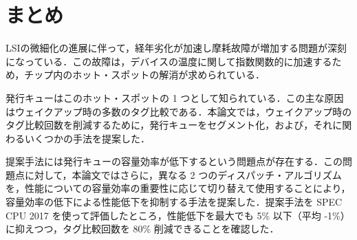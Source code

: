
\chapter{まとめ}
\label{sec:summary}
LSIの微細化の進展に伴って，経年劣化が加速し摩耗故障が増加する問題が深刻になっている．この故障は，デバイスの温度に関して指数関数的に加速するため，チップ内のホット・スポットの解消が求められている．

発行キューはこのホット・スポットの 1 つとして知られている．この主な原因はウェイクアップ時の多数のタグ比較である．本論文では，ウェイクアップ時のタグ比較回数を削減するために，発行キューをセグメント化，および，それに関わるいくつかの手法を提案した．

提案手法には発行キューの容量効率が低下するという問題点が存在する．この問題点に対して，本論文ではさらに，異なる 2 つのディスパッチ・アルゴリズムを，性能についての容量効率の重要性に応じて切り替えて使用することにより，容量効率の低下による性能低下を抑制する手法を提案した．提案手法を SPEC CPU 2017 を使って評価したところ，性能低下を最大でも 5\% 以下（平均 -1\%）に抑えつつ，タグ比較回数を 80\% 削減できることを確認した．
